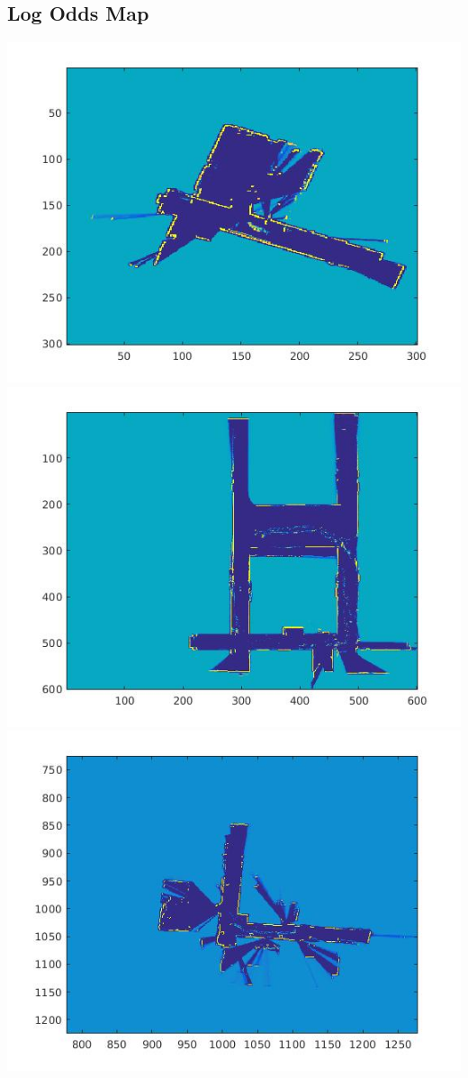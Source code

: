 \documentclass[english]{article}
\begin{document}
\subsection*{Log Odds Map}
\includegraphics[scale=0.8]{logmap0.jpg}\\
\includegraphics[scale=0.8]{logmap1.jpg}\\
\includegraphics[scale=0.8]{logmap2.jpg}\\
\end{document}

